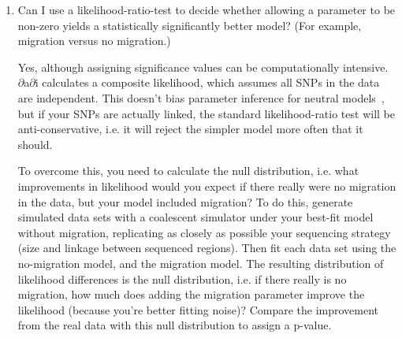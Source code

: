 \documentclass[12pt]{article}
\newcommand{\dadi}{$\partial$a$\partial$i\xspace}
\begin{document}
\begin{enumerate}
\item Can I use a likelihood-ratio-test to decide whether allowing a parameter to be non-zero yields a statistically significantly better model? (For example, migration versus no migration.)

Yes, although assigning significance values can be computationally intensive.
\dadi calculates a composite likelihood, which assumes all SNPs in the data are independent.
This doesn't bias parameter inference for neutral models~\cite{bib:Wiuf2006}, but if your SNPs are actually linked, the standard likelihood-ratio test will be anti-conservative, i.e. it will reject the simpler model more often that it should.

To overcome this, you need to calculate the null distribution, i.e. what improvements in likelihood would you expect if there really were no migration in the data, but your model included migration?
To do this, generate simulated data sets with a coalescent simulator under your best-fit model without migration, replicating as closely as possible your sequencing strategy (size and linkage between sequenced regions).
Then fit each data set using the no-migration model, and the migration model.
The resulting distribution of likelihood differences is the null distribution, i.e. if there really is no migration, how much does
adding the migration parameter improve the likelihood (because you're better fitting noise)?
Compare the improvement from the real data with this null distribution to assign a p-value.

\end{enumerate}



\end{document}
